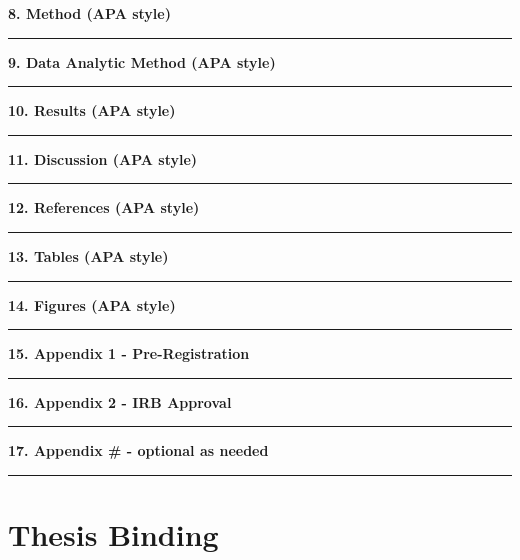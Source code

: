 \documentclass[openany]{book}
\begin{document}
\textbf{8. Method (APA style)}

\begin{center}\rule{0.5\linewidth}{0.5pt}\end{center}

\textbf{9. Data Analytic Method (APA style)}

\begin{center}\rule{0.5\linewidth}{0.5pt}\end{center}

\textbf{10. Results (APA style)}

\begin{center}\rule{0.5\linewidth}{0.5pt}\end{center}

\textbf{11. Discussion (APA style)}

\begin{center}\rule{0.5\linewidth}{0.5pt}\end{center}

\textbf{12. References (APA style)}

\begin{center}\rule{0.5\linewidth}{0.5pt}\end{center}

\textbf{13. Tables (APA style)}

\begin{center}\rule{0.5\linewidth}{0.5pt}\end{center}

\textbf{14. Figures (APA style)}

\begin{center}\rule{0.5\linewidth}{0.5pt}\end{center}

\textbf{15. Appendix 1 - Pre-Registration}

\begin{center}\rule{0.5\linewidth}{0.5pt}\end{center}

\textbf{16. Appendix 2 - IRB Approval}

\begin{center}\rule{0.5\linewidth}{0.5pt}\end{center}

\textbf{17. Appendix \# - optional as needed}

\begin{center}\rule{0.5\linewidth}{0.5pt}\end{center}

\hypertarget{thesis-binding}{%
\chapter{Thesis Binding}\label{thesis-binding}}
\end{document}
